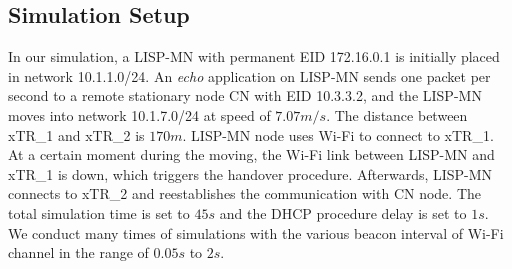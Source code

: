 \subsection{Simulation Setup}
\label{subsec:ns3_setup}
In our simulation, a LISP-MN with permanent EID 172.16.0.1 is initially placed in network 10.1.1.0/24. An \emph{echo} application on LISP-MN sends one packet per second to a remote stationary node CN with EID 10.3.3.2, and the LISP-MN moves into network 10.1.7.0/24 at speed of $7.07m/s$. The distance between xTR\_1 and xTR\_2 is $170m$. LISP-MN node uses Wi-Fi to connect to xTR\_1. At a certain moment during the moving, the Wi-Fi link between LISP-MN and xTR\_1 is down, which triggers the handover procedure. Afterwards, LISP-MN connects to xTR\_2 and reestablishes the communication with CN node. The total simulation time is set to $45s$ and the DHCP procedure delay is set to $1s$. We conduct many times of simulations with the various beacon interval of Wi-Fi channel in the range of $0.05s$ to $2s$.

